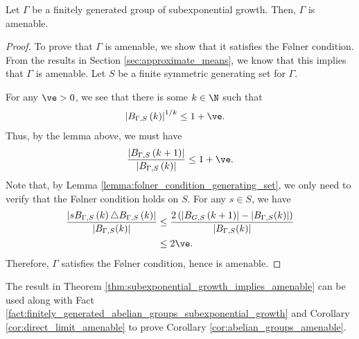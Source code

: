 \begin{theorem}\label{thm:subexponential_growth_implies_amenable}
  Let $\Gamma$ be a finitely generated group of subexponential growth. Then, $\Gamma$ is amenable.
\end{theorem}
\begin{proof}
  To prove that $\Gamma$ is amenable, we show that it satisfies the Følner condition. From the results in Section \ref{sec:approximate_means}, we know that this implies that $\Gamma$ is amenable. Let $S$ be a finite symmetric generating set for $\Gamma$.\newline

  For any $\ve > 0$, we see that there is some $k\in \N$ such that
  \begin{align*}
    \left\vert B_{\Gamma,S}\left(k\right) \right\vert^{1/k} &\leq 1 + \ve.
  \end{align*}
  Thus, by the lemma above, we must have
  \begin{align*}
    \frac{\left\vert B_{\Gamma,S}\left(k+1\right) \right\vert}{\left\vert B_{\Gamma,S} \left(k\right)\right\vert} \leq 1 + \ve.
  \end{align*}
  Note that, by Lemma \ref{lemma:folner_condition_generating_set}, we only need to verify that the Følner condition holds on $S$. For any $s\in S$, we have
  \begin{align*}
    \frac{\left\vert sB_{\Gamma,S}\left(k\right)\triangle B_{\Gamma,S}\left(k\right) \right\vert}{\left\vert B_{\Gamma,S}(k) \right\vert} &\leq \frac{2\left(\left\vert B_{G,S}\left(k+1\right) \right\vert - \left\vert B_{\Gamma,S}(k) \right\vert\right)}{\left\vert B_{\Gamma,S}(k) \right\vert}\\
                                                                                                                    &\leq 2\ve.
  \end{align*}
  Therefore, $\Gamma$ satisfies the Følner condition, hence is amenable.
\end{proof}
\begin{remark}
  The result in Theorem \ref{thm:subexponential_growth_implies_amenable} can be used along with Fact \ref{fact:finitely_generated_abelian_groups_subexponential_growth} and Corollary \ref{cor:direct_limit_amenable} to prove Corollary \ref{cor:abelian_groups_amenable}.
\end{remark}

